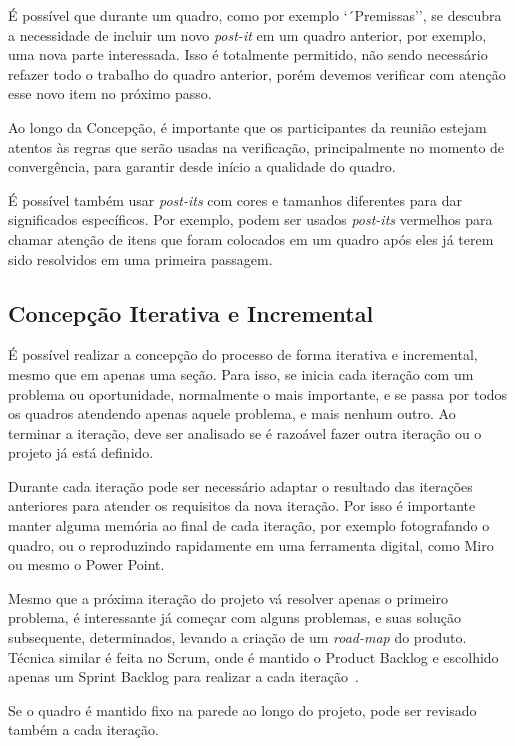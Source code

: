 \documentclass[a4]{report}
\begin{document}
É possível que durante um quadro, como por exemplo `´Premissas'', se descubra a necessidade de incluir um novo \textit{post-it} em um quadro anterior, por exemplo, uma nova parte interessada. Isso é totalmente permitido, não sendo necessário refazer todo o trabalho do quadro anterior, porém devemos verificar com atenção esse novo item no próximo passo.

Ao longo da Concepção, é importante que os participantes da reunião estejam atentos às regras que serão usadas na verificação, principalmente no momento de convergência, para garantir desde início a qualidade do quadro.

É possível também usar \textit{post-its} com cores e tamanhos diferentes para dar significados específicos. Por exemplo, podem ser usados \textit{post-its} vermelhos para chamar atenção de itens que foram colocados em um quadro após eles já terem sido resolvidos em uma primeira passagem.

\subsection{Concepção Iterativa e Incremental}

É possível realizar a concepção do processo de forma iterativa e incremental, mesmo que em apenas uma seção. Para isso, se inicia cada iteração com um problema ou oportunidade, normalmente o mais importante, e se passa por todos os quadros atendendo apenas aquele problema, e mais nenhum outro. Ao terminar a iteração, deve ser analisado se é razoável fazer outra iteração ou o projeto já está definido.

Durante cada iteração pode ser necessário adaptar o resultado das iterações anteriores para atender os requisitos da nova iteração. Por isso é importante manter alguma memória ao final de cada iteração, por exemplo fotografando o quadro, ou o reproduzindo rapidamente em uma ferramenta digital, como Miro ou mesmo o Power Point.

Mesmo que a próxima iteração do projeto vá resolver apenas o primeiro problema, é interessante já começar com alguns problemas, e suas solução subsequente, determinados, levando a criação de um \textit{road-map} do produto. Técnica similar é feita no Scrum, onde é mantido o Product Backlog e escolhido apenas um Sprint Backlog para realizar a cada iteração~\citep{scrum:sbok:guide}.

Se o quadro é mantido fixo na parede ao longo do projeto, pode ser revisado também a cada iteração.
\end{document}
